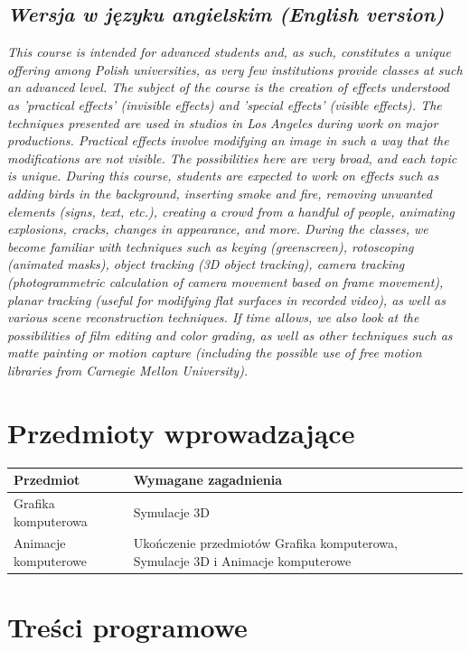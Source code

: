 \documentclass[12pt, a4paper]{article}
\begin{document}
\subsection*{\textit{Wersja w języku angielskim (English version)}}

\textit{This course is intended for advanced students and, as such, constitutes a unique offering among Polish universities, as very few institutions provide classes at such an advanced level. The subject of the course is the creation of effects understood as 'practical effects' (invisible effects) and 'special effects' (visible effects). The techniques presented are used in studios in Los Angeles during work on major productions. Practical effects involve modifying an image in such a way that the modifications are not visible. The possibilities here are very broad, and each topic is unique. During this course, students are expected to work on effects such as adding birds in the background, inserting smoke and fire, removing unwanted elements (signs, text, etc.), creating a crowd from a handful of people, animating explosions, cracks, changes in appearance, and more. During the classes, we become familiar with techniques such as keying (greenscreen), rotoscoping (animated masks), object tracking (3D object tracking), camera tracking (photogrammetric calculation of camera movement based on frame movement), planar tracking (useful for modifying flat surfaces in recorded video), as well as various scene reconstruction techniques. If time allows, we also look at the possibilities of film editing and color grading, as well as other techniques such as matte painting or motion capture (including the possible use of free motion libraries from Carnegie Mellon University).}


\section{Przedmioty wprowadzające}

\begin{tabularx}{\textwidth}{lX}
  \hline
  \textbf{Przedmiot} & \textbf{Wymagane zagadnienia} \\
  \hline
  Grafika komputerowa & Symulacje 3D \\
  Animacje komputerowe & Ukończenie przedmiotów  Grafika komputerowa,  Symulacje 3D i  Animacje komputerowe \\
  \hline
\end{tabularx}

\section{Treści programowe}
\end{document}

